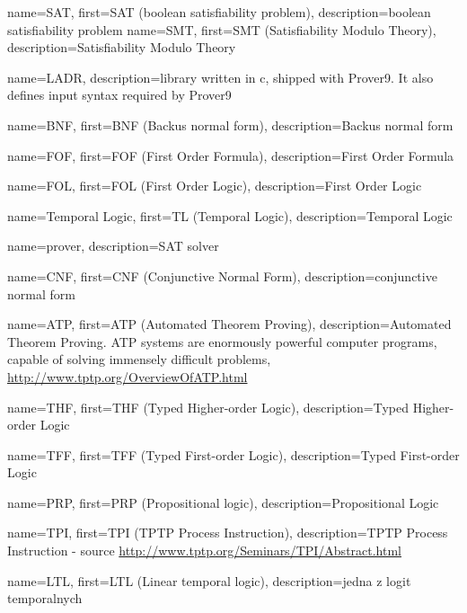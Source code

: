 
 {
    name=SAT,
    first={SAT (boolean satisfiability problem)},
    description={boolean satisfiability problem}
}
 {
    name=SMT,
    first={SMT (Satisfiability Modulo Theory)},
    description={Satisfiability Modulo Theory}
}

 {
    name=LADR,
    description={library written in c, shipped with Prover9. It also defines input syntax required by Prover9}
}

 {
    name=BNF,
    first={BNF (Backus normal form)},
    description={Backus normal form}
}

 {
    name=FOF,
    first={FOF (First Order Formula)},
    description={First Order Formula}
}

 {
    name=FOL,
    first={FOL (First Order Logic)},
    description={First Order Logic}
}

 {
    name={Temporal Logic},
    first={TL (Temporal Logic)},
    description={Temporal Logic}
}

 {
    name=prover,
    description={SAT solver}
}

 {
    name=CNF,
    first={CNF (Conjunctive Normal Form)},
    description={conjunctive normal form}
}

 {
    name=ATP,
    first={ATP (Automated Theorem Proving)},
    description={Automated Theorem Proving. ATP systems are enormously powerful computer programs, capable of solving immensely difficult problems, \url{http://www.tptp.org/OverviewOfATP.html}}
}

 {
    name=THF,
    first={THF (Typed Higher-order Logic)},
    description={Typed Higher-order Logic}
}

 {
    name=TFF,
    first={TFF (Typed First-order Logic)},
    description={Typed First-order Logic}
}

 {
    name={PRP},
    first={PRP (Propositional logic)},
    description={Propositional Logic}
}

 {
    name=TPI,
    first={TPI (TPTP Process Instruction)},
    description={TPTP Process Instruction - source \url{http://www.tptp.org/Seminars/TPI/Abstract.html}}
}

 {
    name=LTL,
    first={LTL (Linear temporal logic)},
    description={jedna z logit temporalnych}
}


